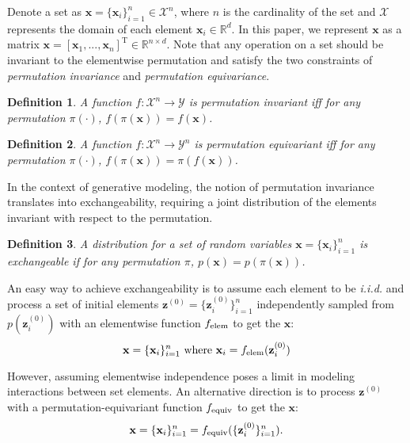 \documentclass[final]{arxiv/cvpr}
\newtheorem{defn}{Definition}
\begin{document}
\label{sec:equivariant}
Denote a set as $\mathbf{x} = \{\mathbf{x}_i\}_{i=1}^n \in \mathcal{X}^n$, where $n$ is the cardinality of the set and $\mathcal{X}$ represents the domain of each element $\mathbf{x}_i \in\mathbb{R}^d$.
In this paper, we represent $\mathbf{x}$ as a matrix $\mathbf{x} = [\mathbf{x}_1, ..., \mathbf{x}_n]^\mathrm{T} \in\mathbb{R}^{n\times d}$.
Note that any operation on a set should be invariant to the elementwise permutation and satisfy the two constraints of \textit{permutation invariance} and \textit{permutation equivariance}.
\begin{defn}
A function $f:\mathcal{X}^n \rightarrow \mathcal{Y}$ is permutation invariant iff for any permutation $\pi(\cdot)$, $f(\pi(\mathbf{x}))= f(\mathbf{x})$.
\end{defn}
\begin{defn}
A function $f:\mathcal{X}^n \rightarrow \mathcal{Y}^n$ is permutation equivariant iff for any permutation $\pi(\cdot)$, $f(\pi(\mathbf{x}))=\pi( f(\mathbf{x}))$.
\end{defn}
In the context of generative modeling, the notion of permutation invariance translates into exchangeability, requiring a joint distribution of the elements invariant with respect to the permutation.
\begin{defn}
A distribution for a set of random variables $\mathbf{x} = \{\mathbf{x}_i\}_{i=1}^n$ is exchangeable if for any permutation $\pi$,
$p(\mathbf{x}) = p(\pi(\mathbf{x}))$.
\end{defn}

An easy way to achieve exchangeability is to assume each element to be \emph{i.i.d.} and process a set of initial elements $\mathbf{z}^{(0)} = \{\mathbf{z}_i^{(0)}\}_{i=1}^n$ independently sampled from $p(\mathbf{z}_i^{(0)})$ with an elementwise function $f_{\textnormal{elem}}$ to get the $\mathbf{x}$:
\begin{equation}
    \mathbf{x} = \{\mathbf{x}_i\}_{i=1}^n \textnormal{ where } \mathbf{x}_i = f_{\textnormal{elem}} (\mathbf{z}_i^{(0)})
\end{equation}

However, assuming elementwise independence poses a limit in modeling interactions between set elements.
An alternative direction is to process $\mathbf{z}^{(0)}$ with a permutation-equivariant function $f_{\textnormal{equiv}}$ to get the $\mathbf{x}$:
\begin{equation}
    \mathbf{x} = \{\mathbf{x}_i\}_{i=1}^n = f_{\textnormal{equiv}}(\{\mathbf{z}_i^{(0)}\}_{i=1}^n).
\end{equation}
\end{document}
